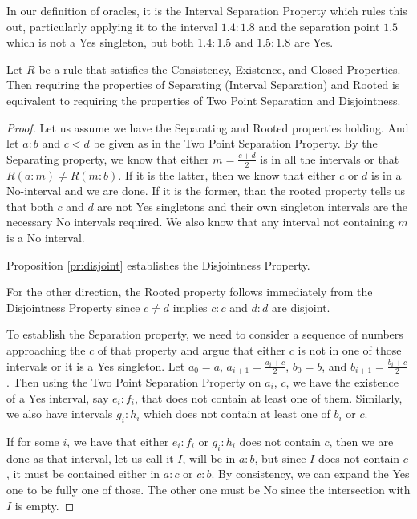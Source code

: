 \documentclass[12pt]{article}
\begin{document}
In our definition of oracles, it is the Interval Separation Property which rules this out, particularly applying it to the interval $1.4:1.8$ and the separation point $1.5$ which is not a Yes singleton, but both $1.4:1.5$ and $1.5:1.8$ are Yes. 

\begin{proposition}
    Let $R$ be a rule that satisfies the Consistency, Existence, and Closed Properties. Then requiring the properties of Separating (Interval Separation) and Rooted is equivalent to requiring the properties of Two Point Separation and Disjointness. 
\end{proposition}

\begin{proof}
    Let us assume we have the Separating and Rooted properties holding. And let $a:b$ and $c\lt d$ be given as in the Two Point Separation Property. By the Separating property, we know that either $m =\frac{c+d}{2}$ is in all the intervals or that $R(a:m) \neq R(m:b)$. If it is the latter, then we know that either $c$ or $d$ is in a No-interval and we are done. If it is the former, than the rooted property tells us that both $c$ and $d$ are not Yes singletons and their own singleton intervals are the necessary No intervals required. We also know that any interval not containing $m$ is a No interval. 
    
    Proposition \ref{pr:disjoint} establishes the Disjointness Property. 

    For the other direction, the Rooted property follows immediately from the Disjointness Property since $c \neq d$ implies $c:c$ and $d:d$ are disjoint. 
    
    To establish the Separation property, we need to consider a sequence of numbers approaching the $c$ of that property and argue that either $c$ is not in one of those intervals or it is a Yes singleton. Let $a_0=a$, $a_{i+1} = \frac{a_i + c}{2}$, $b_0 = b$, and $b_{i+1} = \frac{b_i + c}{2}$. Then using the Two Point Separation Property on $a_i$, $c$, we have the existence of a Yes interval, say $e_i:f_i$, that does not contain at least one of them. Similarly, we also have intervals $g_i:h_i$ which does not contain at least one of $b_i$ or $c$. 
    
    If for some $i$,  we have that either $e_i:f_i$ or $g_i:h_i$ does not contain $c$, then we are done as that interval, let us call it $I$,  will be in $a:b$, but since $I$ does not contain $c$, it must be contained either in $a:c$ or $c:b$. By consistency, we can expand the Yes one to be fully one of those. The other one must be No since the intersection with $I$ is empty. 
    

\end{proof}
\end{document}
